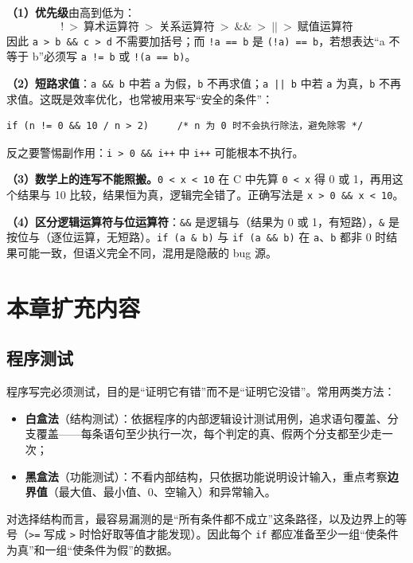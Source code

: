 \textbf{（1）优先级}由高到低为：
\[
\texttt{!}\ >\ \text{算术运算符}\ >\ \text{关系运算符}\ >\ \texttt{\&\&}\ >\ \texttt{||}\ >\ \text{赋值运算符}
\]
因此 \texttt{a > b \&\& c > d} 不需要加括号；而 \texttt{!a == b} 是 \texttt{(!a) == b}，若想表达“a 不等于 b”必须写 \texttt{a != b} 或 \texttt{!(a == b)}。

\textbf{（2）短路求值}：\texttt{a \&\& b} 中若 \texttt{a} 为假，\texttt{b} 不再求值；\texttt{a || b} 中若 \texttt{a} 为真，\texttt{b} 不再求值。这既是效率优化，也常被用来写“安全的条件”：

\begin{lstlisting}
if (n != 0 && 10 / n > 2)     /* n 为 0 时不会执行除法，避免除零 */
\end{lstlisting}

反之要警惕副作用：\texttt{i > 0 \&\& i++} 中 \texttt{i++} 可能根本不执行。

\textbf{（3）数学上的连写不能照搬。}\texttt{0 < x < 10} 在 C 中先算 \texttt{0 < x} 得 0 或 1，再用这个结果与 10 比较，结果恒为真，逻辑完全错了。正确写法是 \texttt{x > 0 \&\& x < 10}。

\textbf{（4）区分逻辑运算符与位运算符}：\texttt{\&\&} 是逻辑与（结果为 0 或 1，有短路），\texttt{\&} 是按位与（逐位运算，无短路）。\texttt{if (a \& b)} 与 \texttt{if (a \&\& b)} 在 \texttt{a}、\texttt{b} 都非 0 时结果可能一致，但语义完全不同，混用是隐蔽的 bug 源。

\section{本章扩充内容}

\subsection{程序测试}

程序写完必须测试，目的是“证明它有错”而不是“证明它没错”。常用两类方法：

\begin{itemize}
  \item \textbf{白盒法}（结构测试）：依据程序的内部逻辑设计测试用例，追求语句覆盖、分支覆盖——每条语句至少执行一次，每个判定的真、假两个分支都至少走一次；
  \item \textbf{黑盒法}（功能测试）：不看内部结构，只依据功能说明设计输入，重点考察\textbf{边界值}（最大值、最小值、0、空输入）和异常输入。
\end{itemize}

对选择结构而言，最容易漏测的是“所有条件都不成立”这条路径，以及边界上的等号（\texttt{>=} 写成 \texttt{>} 时恰好取等值才能发现）。因此每个 \texttt{if} 都应准备至少一组“使条件为真”和一组“使条件为假”的数据。

